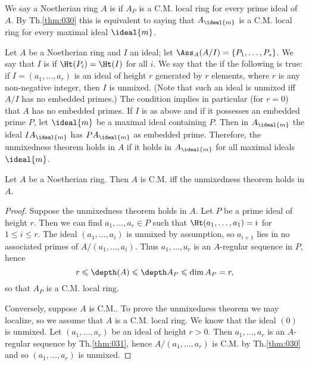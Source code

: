\documentclass[../main]{subfiles}
\begin{document}
\newparagraph We say a Noetherian ring $A$ is  if $A_P$ is a C.M. local ring for every prime ideal of $A$. By Th.\ref{thm:030} this is equivalent to saying that $A_{\ideal{m}}$ is a C.M. local ring for every maximal ideal $\ideal{m}$.

Let $A$ be a Noetherian ring and $I$ an ideal; let $\Ass_A(A / I)=\{P_1, \ldots, P_s\}$. We say that $I$ is  if $\Ht(P_i)=\Ht(I)$ for all $i$. We say that the  if the following is true: if $I=(a_1, \ldots, a_r)$ is an ideal of height $r$ generated by $r$ elements, where $r$ is any non-negative integer, then $I$ is unmixed. (Note that such an ideal is unmixed iff $A / I$ has no embedded primes.) The condition implies in particular (for $r=0$) that $A$ has no embedded primes. If $I$ is as above and if it possesses an embedded prime $P$, let $\ideal{m}$ be a maximal ideal containing $P$. Then in $A_{\ideal{m}}$ the ideal $IA_{\ideal{m}}$ has $PA_{\ideal{m}}$ as embedded prime. Therefore, the unmixedness theorem holds in $A$ if it holds in $A_{\ideal{m}}$ for all maximal ideals $\ideal{m}$.

\begin{theorem}\label{thm:032}
Let $A$ be a Noetherian ring. Then $A$ is C.M. iff the unmixedness theorem holds in $A$.
\end{theorem}

\begin{proof}
Suppose the unmixedness theorem holds in $A$. Let $P$ be a prime ideal of height $r$. Then we can find $a_1, \ldots, a_r \in P$ such that $\Ht (a_1, \ldots, a_1)=i$ for $1 \leqslant i \leqslant r$. The ideal $(a_1, \ldots, a_i)$ is unmixed by assumption, so $a_{i+1}$ lies in no associated primes of $A /(a_1, \ldots, a_i)$. Thus $a_1, \ldots, a_r$ is an $A$-regular sequence in $P$, hence \[r \leqslant \depth(A) \leqslant \depth A_P \leqslant \dim A_P=r,\] so that $A_P$ is a C.M. local ring.

Conversely, suppose $A$ is C.M.. To prove the unmixedness theorem we may localize, so we assume that $A$ is a C.M. local ring. We know that the ideal $(0)$ is unmixed. Let $(a_1, \ldots, a_r)$ be an ideal of height $r>0$. Then $a_1, \ldots, a_r$ is an $A$-regular sequence by Th.\ref{thm:031}, hence $A /(a_1, \ldots, a_r)$ is C.M. by Th.\ref{thm:030} and so $(a_1, \ldots, a_r)$ is unmixed.
\end{proof}
\end{document}
